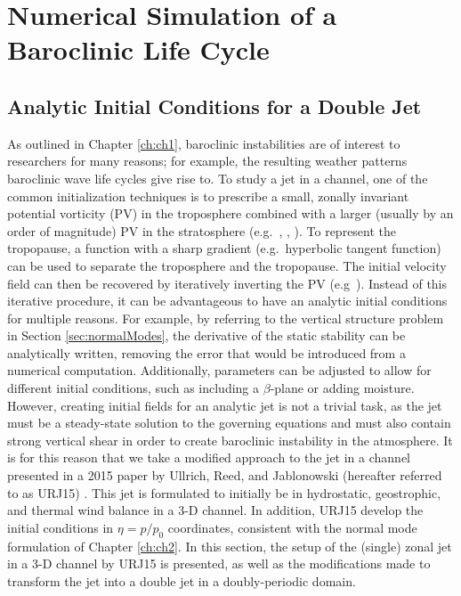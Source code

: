 \chapter{Numerical Simulation of a Baroclinic Life Cycle}
\label{ch:ch3}
\section{Analytic Initial Conditions for a Double Jet}
As outlined in Chapter \ref{ch:ch1}, baroclinic instabilities are of interest to researchers for many reasons; for example, the resulting weather patterns baroclinic wave life cycles give rise to. To study a jet in a channel, one of the common initialization techniques is to prescribe a small, zonally invariant potential vorticity (PV) in the troposphere combined with a larger (usually by an order of magnitude)  PV in the stratosphere (e.g.\  \cite{Zhang2004}, \cite{Plougonven2007}, \cite{Waite2009}).  To represent the tropopause, a function with a sharp gradient (e.g.\ hyperbolic tangent function) can be used to separate the troposphere and the tropopause. The initial velocity field can then be recovered by iteratively inverting the PV (e.g\ \cite{Plougonven2007}). Instead of this iterative procedure, it can be advantageous to have an analytic initial conditions for multiple reasons. For example, by referring to the vertical structure problem in Section \ref{sec:normalModes}, the derivative of the static stability can be analytically written, removing the error that would be introduced from a numerical computation. Additionally, parameters can be adjusted to allow for different initial conditions, such as including a $\beta$-plane or adding moisture.\\

 However, creating initial fields for an analytic jet is not a trivial task, as the jet must be a steady-state solution to the governing equations and must also contain strong vertical shear in order to create baroclinic instability in the atmosphere. It is for this reason that we take a modified approach to the jet in a channel presented in a 2015 paper by Ullrich, Reed, and Jablonowski (hereafter referred to as URJ15) \cite{Ullrich2015}. This jet is formulated to initially be in hydrostatic, geostrophic, and thermal wind balance in a 3-D channel. In addition, URJ15 develop the initial conditions in $\eta = p/p_0$ coordinates, consistent with the normal mode formulation of Chapter \ref{ch:ch2}. In this section, the setup of the (single) zonal jet in a 3-D channel by URJ15 is presented, as well as the modifications made to transform the jet into a double jet in a doubly-periodic domain.

